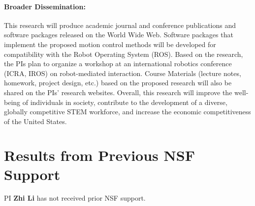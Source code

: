 \documentclass[letterpaper, 11 pt, onecolumn]{article}
\begin{document}
\paragraph*{Broader Dissemination:}
This research will produce academic journal and conference publications and software packages released on the World Wide Web. Software packages that implement the proposed motion control methods will be developed for compatibility with the Robot Operating System (ROS). Based on the research, the PIs plan to organize a workshop at an international robotics conference (ICRA, IROS) on robot-mediated interaction. Course Materials (lecture notes, homework, project design, etc.) based on the proposed research will also be shared on the PIs' research websites. Overall, this research will improve the well-being of individuals in society, contribute to the development of a diverse, globally competitive STEM workforce, and increase the economic competitiveness of the United States.


\section{Results from Previous NSF Support}\label{sec:priorNSF}

PI \textbf{Zhi Li} has not received prior NSF support.
\end{document}
